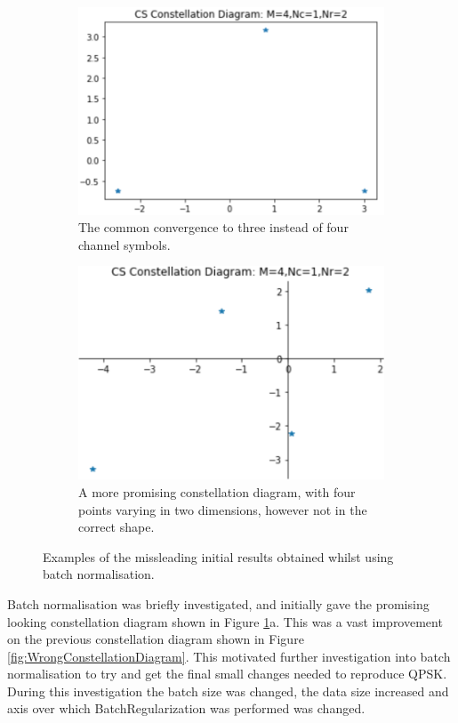 \documentclass[12pt,onecolumn,letterpaper]{article}
\begin{document}
\begin{figure}[t!]
\begin{subfigure}[t]{0.2\textwidth}
       \includegraphics[width=\linewidth]{figures/ae2_2_wrong_const_diag_3points.png}
       \caption{The common convergence to three instead of four channel symbols.}
   \end{subfigure}
   \hfill
   \begin{subfigure}[t]{0.2\textwidth}
       \centering
       \includegraphics[width=\linewidth]{figures/ae2_2_wrong_qpsk_kite_w_title.png}
       \caption{A more promising constellation diagram, with four points varying in two dimensions, however not in the correct shape.}
   \end{subfigure}
   \caption{Examples of the missleading initial results obtained whilst using batch normalisation.}
   \label{fig:BatchNormConstDiags}
\end{figure}


Batch normalisation was briefly investigated, and initially gave the promising looking constellation diagram shown in Figure \ref{fig:BatchNormConstDiags}a. This was a vast improvement on the previous constellation diagram shown in Figure \ref{fig:WrongConstellationDiagram}. This motivated further investigation into batch normalisation to try and get the final small changes needed to reproduce QPSK. During this investigation 
the batch size was changed, the data size increased and axis over which BatchRegularization was performed was changed.
\end{document}

